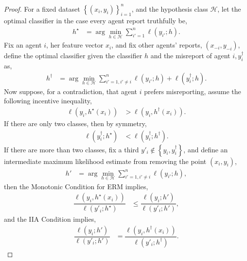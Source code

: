 \documentclass{article}
\begin{document}
\begin{proof} \label{proof:marginermpf} 
For a fixed dataset $\left\{\left(x_{i}, y_{i}\right)\right\}_{i=1}^{n}$, and the hypothesis class $\mathcal{H}$, let the optimal classifier in the case every agent report truthfully be,
\begin{align*}
h^\star  &= \arg\displaystyle\min_{h \in \mathcal{H}} \displaystyle\sum_{i'=1}^{n} \ell\left(y_{i'} ; h\right).
\end{align*}
Fix an agent $i $, her feature vector $x_{i}$, and fix other agents' reports, $\left(x_{-i}, y_{-i}\right)$, define the optimal classifier given the classifier $h $ and the misreport of agent $i , y^{\dagger}_{i}$ as,
\begin{align*}
h^{\dagger} &= \arg\displaystyle\min_{h \in \mathcal{H}} \displaystyle\sum_{i'=1, i' \neq  i}^{n} \ell\left(y_{i'} ; h\right) + \ell\left(y^{\dagger}_{i} ; h\right).
\end{align*}
Now suppose, for a contradiction, that agent $i $ prefers misreporting, assume the following incentive inequality,
\begin{align*}
\ell\left(y_{i}, h^\star \left(x_{i}\right)\right) &> \ell\left(y_{i},  h^{\dagger}\left(x_{i}\right)\right).
\end{align*}
If there are only two classes, then by symmetry,
\begin{align*}
\ell\left(y^{\dagger}_{i} ; h^\star \right) &< \ell\left(y^{\dagger}_{i} ; h^{\dagger}\right).
\end{align*}
If there are more than two classes, fix a third $y'_{i} \notin \left\{y_{i}, y^{\dagger}_{i}\right\}$, and define an intermediate maximum likelihood estimate from removing the point $\left(x_{i}, y_{i}\right)$,
\begin{align*}
h' &= \arg\displaystyle\min_{h \in \mathcal{H}} \displaystyle\sum_{i' = 1, i' \neq  i}^{n} \ell\left(y_{i'} ; h\right),
\end{align*}
then the Monotonic Condition for ERM implies,
\begin{align*}
\dfrac{\ell\left(y_{i}, h^\star \left(x_{i}\right)\right)}{\ell\left(y'_{i} ; h^\star \right)} &\leq  \dfrac{\ell\left(y_{i} ; h'\right)}{\ell\left(y'_{i} ; h'\right)},
\end{align*}
and the IIA Condition implies,
\begin{align*}
\dfrac{\ell\left(y_{i} ; h'\right)}{\ell\left(y'_{i} ; h'\right)} &= \dfrac{\ell\left(y_{i},  h^{\dagger}\left(x_{i}\right)\right)}{\ell\left(y'_{i} ; h^{\dagger}\right)}.
\end{align*}

\end{proof}
\end{document}
